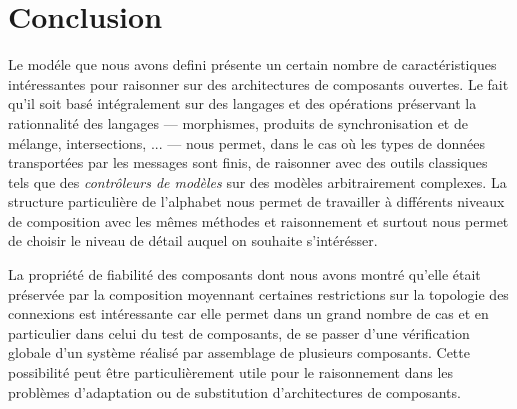 \section{Conclusion}

Le mod\'ele que nous avons defini pr\'esente un certain nombre de
caract\'eristiques int\'eressantes pour raisonner sur des
architectures de composants ouvertes. Le fait qu'il soit bas\'e
int\'egralement sur des langages et des op\'erations pr\'eservant
la rationnalit\'e des langages --- morphismes, produits de
synchronisation et de m\'elange, intersections, ... --- nous permet,
dans le cas o\`u les types de donn\'ees transport\'ees par les
messages sont finis, de raisonner avec des outils classiques tels que
des \emph{contr\^oleurs de mod\`eles} sur des mod\`eles
arbitrairement complexes.
La structure particuli\`ere de l'alphabet nous permet de travailler
\`a diff\'erents niveaux de composition avec les m\^emes
m\'ethodes et raisonnement et surtout nous permet de choisir le
niveau de d\'etail auquel on souhaite s'int\'er\'esser. 

La propri\'et\'e de fiabilit\'e des composants dont nous avons
montr\'e qu'elle \'etait pr\'eserv\'ee par la composition
moyennant certaines restrictions sur la topologie des connexions  est
int\'eressante car elle permet dans un grand nombre de cas et en
particulier dans celui du test de composants, de se
passer d'une v\'erification globale d'un syst\`eme r\'ealis\'e par
assemblage de plusieurs composants. Cette possibilit\'e peut \^etre
particuli\`erement utile pour le raisonnement dans les probl\`emes
d'adaptation ou de substitution d'architectures de composants.

